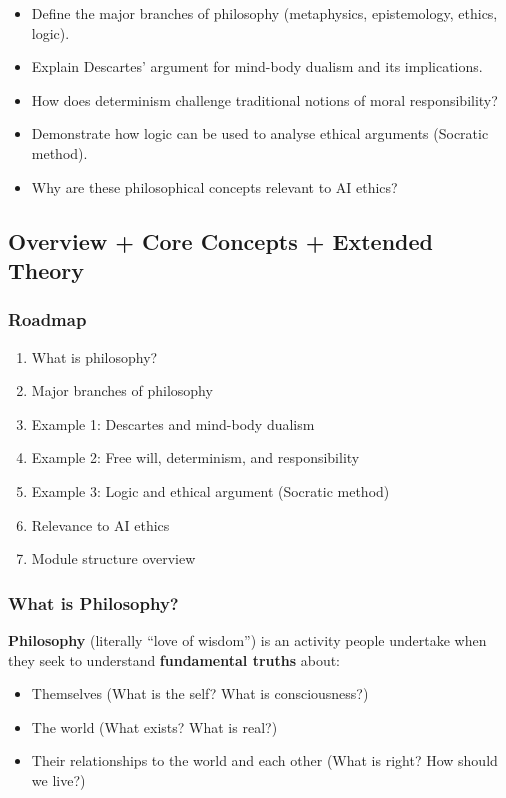 \begin{itemize}
  \item Define the major branches of philosophy (metaphysics, epistemology, ethics, logic).
  \item Explain Descartes' argument for mind-body dualism and its implications.
  \item How does determinism challenge traditional notions of moral responsibility?
  \item Demonstrate how logic can be used to analyse ethical arguments (Socratic method).
  \item Why are these philosophical concepts relevant to AI ethics?
\end{itemize}

\bigseparator

\subsection{Overview + Core Concepts + Extended Theory}

\subsubsection*{Roadmap}
\begin{enumerate}
  \item What is philosophy?
  \item Major branches of philosophy
  \item Example 1: Descartes and mind-body dualism
  \item Example 2: Free will, determinism, and responsibility
  \item Example 3: Logic and ethical argument (Socratic method)
  \item Relevance to AI ethics
  \item Module structure overview
\end{enumerate}

\bigseparator

\subsubsection{What is Philosophy?}

\begin{defbox}[Philosophy]
\textbf{Philosophy} (literally ``love of wisdom'') is an activity people undertake when they seek to understand \textbf{fundamental truths} about:
\begin{itemize}
  \item Themselves (What is the self? What is consciousness?)
  \item The world (What exists? What is real?)
  \item Their relationships to the world and each other (What is right? How should we live?)
\end{itemize}
\end{defbox}

